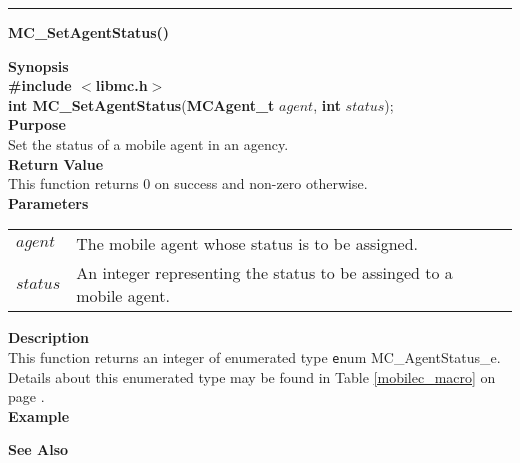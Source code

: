 \noindent
\vspace{5pt}
\rule{6.5in}{0.015in}
\noindent
{\LARGE \bf MC\_SetAgentStatus()}\\
{}
\label{api:MC_SetAgentStatus()}

\noindent
{\bf Synopsis}\\
{\bf \#include $<$libmc.h$>$}\\
{\bf int MC\_SetAgentStatus}({\bf MCAgent\_t} $agent$, {\bf int} $status$);\\

\noindent
{\bf Purpose}\\
Set the status of a mobile agent in an agency.\\

\noindent
{\bf Return Value}\\
This function returns 0 on success and non-zero otherwise.\\

\noindent
{\bf Parameters}
\vspace{-0.1in}
\begin{description}
\item               
\begin{tabular}{p{10 mm}p{145 mm}}
$agent$ & The mobile agent whose status is to be assigned.\\
$status$ & An integer representing the status to be assinged to a mobile agent.
\end{tabular}
\end{description}

\noindent
{\bf Description}\\
This function returns an integer of enumerated type
{\texttt enum MC\_AgentStatus\_e}. Details about this enumerated type may be
found in Table \ref{mobilec_macro} on page \pageref{mobilec_macro}.\\

\noindent
{\bf Example}\\
\noindent
{\footnotesize}

\noindent
{\bf See Also}\\

